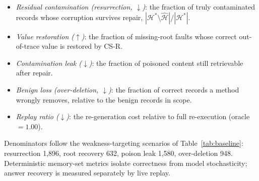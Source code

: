 \documentclass[11pt]{article}
\theoremstyle{remark}
\newcommand{\csr}{\textsc{CS-R}}
\begin{document}
\begin{itemize}
\itemsep0pt
\item \emph{Residual contamination (resurrection, $\downarrow$)}: the fraction of truly
contaminated records whose corruption survives repair,
$|\mathcal{H}^{*}\setminus\hat{\mathcal{H}}|/|\mathcal{H}^{*}|$.
\item \emph{Value restoration ($\uparrow$)}: the fraction of missing-root faults whose
correct out-of-trace value is restored by \csr.
\item \emph{Contamination leak ($\downarrow$)}: the fraction of poisoned content still
retrievable after repair.
\item \emph{Benign loss (over-deletion, $\downarrow$)}: the fraction of correct records a
method wrongly removes, relative to the benign records in scope.
\item \emph{Replay ratio ($\downarrow$)}: the re-generation cost relative to full
re-execution (oracle $=1.00$).
\end{itemize}

Denominators follow the weakness-targeting scenarios of Table~\ref{tab:baseline}:
resurrection 1{,}896, root recovery 632, poison leak 1{,}580, over-deletion 948.
Deterministic memory-set metrics isolate correctness from model stochasticity; answer
recovery is measured separately by live replay.
\end{document}
